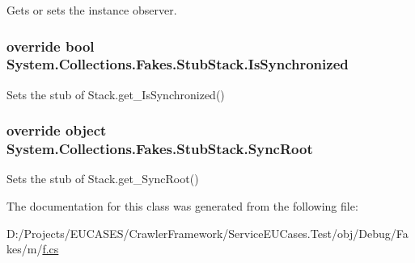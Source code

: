 Gets or sets the instance observer.

\hypertarget{class_system_1_1_collections_1_1_fakes_1_1_stub_stack_ae5c917c678deb4fcb934904973f27128}{
\subsubsection[{Is\-Synchronized}]{\setlength{\rightskip}{0pt plus 5cm}override bool System.\-Collections.\-Fakes.\-Stub\-Stack.\-Is\-Synchronized\hspace{0.3cm}{\ttfamily [get]}}}\label{class_system_1_1_collections_1_1_fakes_1_1_stub_stack_ae5c917c678deb4fcb934904973f27128}


Sets the stub of Stack.\-get\-\_\-\-Is\-Synchronized()

\hypertarget{class_system_1_1_collections_1_1_fakes_1_1_stub_stack_a89d186b5c42b8006e9ef402131e2a240}{
\subsubsection[{Sync\-Root}]{\setlength{\rightskip}{0pt plus 5cm}override object System.\-Collections.\-Fakes.\-Stub\-Stack.\-Sync\-Root\hspace{0.3cm}{\ttfamily [get]}}}\label{class_system_1_1_collections_1_1_fakes_1_1_stub_stack_a89d186b5c42b8006e9ef402131e2a240}


Sets the stub of Stack.\-get\-\_\-\-Sync\-Root()



The documentation for this class was generated from the following file\-:\begin{DoxyCompactItemize}
\item 
D\-:/\-Projects/\-E\-U\-C\-A\-S\-E\-S/\-Crawler\-Framework/\-Service\-E\-U\-Cases.\-Test/obj/\-Debug/\-Fakes/m/\hyperlink{m_2f_8cs}{f.\-cs}\end{DoxyCompactItemize}
